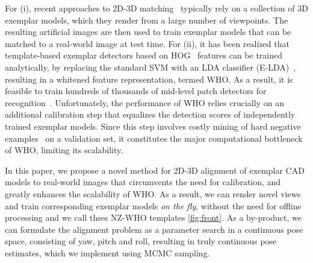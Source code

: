 For (i), recent approaches to 2D-3D matching~\cite{Aubry14, Lim14}
typically rely on a
collection of 3D exemplar models, which they render from a
large number of viewpoints. The resulting artificial images are then
used to train exemplar models that can be matched to a real-world
image at test time.
%
For (ii), it has been realized that template-based exemplar detectors
based on HOG~\cite{Dalal05} features can be trained analytically, by
replacing the standard SVM with an LDA classifier
(E-LDA)~\cite{Hariharan12}, resulting in a whitened feature
representation, termed WHO. As a result, it is feasible to train
hundreds of thousands of mid-level patch detectors for
recognition~\cite{Aubry14}.
%
Unfortunately, the performance of WHO relies crucially on an
additional calibration step that equalizes the detection scores of
independently trained exemplar models. Since this step involves costly
mining of hard negative examples~\cite{Dalal05,Felzenszwalb10} on a
validation set, it constitutes the major computational bottleneck of
WHO, limiting its scalability.

In this paper, we propose a novel method for 2D-3D alignment of
exemplar CAD models to real-world images that circumvents the need for
calibration, and greatly enhances the scalability of WHO. As a
result, we can render novel views and train corresponding exemplar
models {\em on the fly}, without the need for offline processing and we call thses NZ-WHO templates \ref{fig:front}. As a
by-product, we can formulate the alignment problem as a parameter
search in a continuous pose space, consisting of yaw, pitch and roll, resulting in truly continuous pose estimates, which
we implement using MCMC sampling.
%

